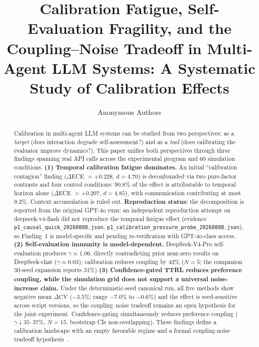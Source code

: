 \documentclass[11pt]{article}
\title{Calibration Fatigue, Self-Evaluation Fragility, and the Coupling--Noise Tradeoff in Multi-Agent LLM Systems: A Systematic Study of Calibration Effects}
\author{Anonymous Authors}
\date{}
\newcommand{\CV}{\ensuremath{\mathrm{CV}}}
\theoremstyle{definition}
\theoremstyle{remark}
\begin{document}
\maketitle

\begin{abstract}
Calibration in multi-agent LLM systems can be studied from two perspectives: as a \textit{target} (does interaction degrade self-assessment?) and as a \textit{tool} (does calibrating the evaluator improve dynamics?). This paper unifies both perspectives through three findings spanning real API calls across the experimental program and 60 simulation conditions. \textbf{(1) Temporal calibration fatigue dominates.} An initial ``calibration contagion'' finding ($\Delta$ECE $= +0.228$, $d = 4.70$) is deconfounded via two pure-factor contrasts and four control conditions: 90.8\% of the effect is attributable to temporal horizon alone ($\Delta$ECE $= +0.207$, $d = 4.85$), with communication contributing at most 9.2\%. Context accumulation is ruled out. \textbf{Reproduction status:} the decomposition is reported from the original GPT-4o runs; an independent reproduction attempt on deepseek-v4-flash did not reproduce the temporal fatigue effect (evidence \texttt{p1\_causal\_quick\_20260808.json}, \texttt{p1\_calibration\_pressure\_probe\_20260808.json}), so Finding~1 is model-specific and pending re-verification with GPT-4o-class access. \textbf{(2) Self-evaluation immunity is model-dependent.} DeepSeek-V4-Pro self-evaluation produces $\gamma \approx 1.06$, directly contradicting prior near-zero results on DeepSeek-chat ($\gamma \approx 0.03$); calibration reduces coupling by 42\% ($N{=}5$; the companion 30-seed expansion reports 31\%) \textbf{(3) Confidence-gated TTRL reduces preference coupling, while the simulation grid does not support a universal noise-increase claim.} Under the deterministic-seed canonical run, all five methods show negative mean $\Delta\CV$ ($-3.5\%$; range $-7.0\%$ to $-0.6\%$) and the effect is seed-sensitive across script versions, so the coupling--noise tradeoff remains an open hypothesis for the joint experiment. Confidence-gating simultaneously reduces preference coupling ($\gamma \downarrow 35$--$37\%$, $N{=}15$, bootstrap CIs non-overlapping). These findings define a calibration landscape with an empty favorable regime and a formal coupling-noise tradeoff hypothesis~\citep{bubeck2012regret}.
\end{abstract}

\newpage

\end{document}
